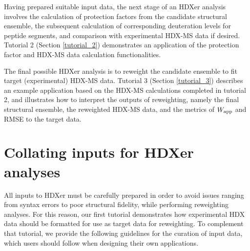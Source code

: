 \documentclass[9pt,tutorial,ASAPversion]{livecoms}
\begin{document}
Having prepared suitable input data, the next stage of an HDXer analysis involves the calculation of protection factors from the candidate structural ensemble, the subsequent calculation of corresponding deuteration levels for peptide segments, and comparison with experimental HDX-MS data if desired.
Tutorial 2 (Section \ref{tutorial_2}) demonstrates an application of the protection factor and HDX-MS data calculation functionalities.

The final possible HDXer analysis is to reweight the candidate ensemble to fit target (experimental) HDX-MS data.
Tutorial 3 (Section \ref{tutorial_3}) describes an example application based on the HDX-MS calculations completed in tutorial 2, and illustrates how to interpret the outputs of reweighting, namely the final structural ensemble, the reweighted HDX-MS data, and the metrics of $W_\textnormal{app}$ and RMSE to the target data. 

\section{Collating inputs for HDXer analyses}\label{collating_inputs}
All inputs to HDXer must be carefully prepared in order to avoid issues ranging from syntax errors to poor structural fidelity, while performing reweighting analyses. 
For this reason, our first tutorial demonstrates how experimental HDX data should be formatted for use as target data for reweighting.
To complement that tutorial, we provide the following guidelines for the curation of input data, which users should follow when designing their own applications.
\end{document}
